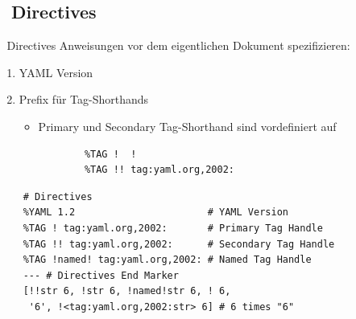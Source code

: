 \documentclass{beamer}
\begin{document}
\subsection{📢 Directives}

\begin{frame}[fragile]{📢 Directives}
  Anweisungen vor dem eigentlichen Dokument spezifizieren:
  \begin{enumerate}
    \item YAML Version 
    \item Prefix für Tag-Shorthands 
    \begin{itemize}
      \item Primary und Secondary Tag-Shorthand sind vordefiniert auf
      \begin{verbatim}
        %TAG !  !
        %TAG !! tag:yaml.org,2002:
      \end{verbatim}
    \end{itemize}
  \end{enumerate}
  \begin{verbatim}
    # Directives
    %YAML 1.2                       # YAML Version
    %TAG ! tag:yaml.org,2002:       # Primary Tag Handle
    %TAG !! tag:yaml.org,2002:      # Secondary Tag Handle
    %TAG !named! tag:yaml.org,2002: # Named Tag Handle
    --- # Directives End Marker
    [!!str 6, !str 6, !named!str 6, ! 6,
     '6', !<tag:yaml.org,2002:str> 6] # 6 times "6"
  \end{verbatim}
\end{frame}
\end{document}
